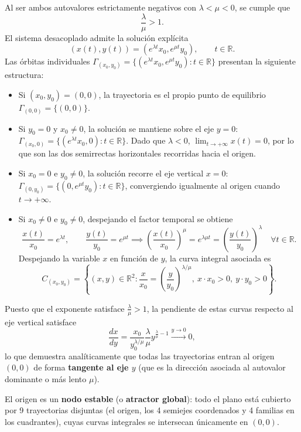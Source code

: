 Al ser ambos autovalores estrictamente negativos con $\lambda < \mu < 0$, se cumple que
\[
    \frac{\lambda}{\mu} > 1.
\]
El sistema desacoplado admite la solución explícita
\[
    (x(t), y(t)) = (e^{\lambda t} x_0, e^{\mu t} y_0), \qquad t \in \mathbb{R}.
\]
Las órbitas individuales $\Gamma_{(x_0, y_0)} = \{ (e^{\lambda t} x_0, e^{\mu t} y_0) : t \in \mathbb{R} \}$ presentan la siguiente estructura:
\begin{itemize}
    \item Si $(x_0, y_0) = (0,0)$, la trayectoria es el propio punto de equilibrio $\Gamma_{(0,0)} = \{ (0,0) \}$.
    \item Si $y_0 = 0$ y $x_0 \neq 0$, la solución se mantiene sobre el eje $y = 0$: $\Gamma_{(x_0, 0)} = \{ (e^{\lambda t} x_0, 0) : t \in \mathbb{R} \}$. Dado que $\lambda < 0$, $\lim_{t \to +\infty} x(t) = 0$, por lo que son las dos semirrectas horizontales recorridas hacia el origen.
    \item Si $x_0 = 0$ e $y_0 \neq 0$, la solución recorre el eje vertical $x = 0$: $\Gamma_{(0, y_0)} = \{ (0, e^{\mu t} y_0) : t \in \mathbb{R} \}$, convergiendo igualmente al origen cuando $t \to +\infty$.
    \item Si $x_0 \neq 0$ e $y_0 \neq 0$, despejando el factor temporal se obtiene
    \[
        \frac{x(t)}{x_0} = e^{\lambda t}, \qquad \frac{y(t)}{y_0} = e^{\mu t}
        \implies
        \left( \frac{x(t)}{x_0} \right)^\mu = e^{\lambda \mu t} = \left( \frac{y(t)}{y_0} \right)^\lambda \quad \forall t \in \mathbb{R}.
    \]
    Despejando la variable $x$ en función de $y$, la curva integral asociada es
    \[
        C_{(x_0, y_0)} = \left\{ (x, y) \in \mathbb{R}^2 : \frac{x}{x_0} = \left( \frac{y}{y_0} \right)^{\lambda/\mu}, \ x \cdot x_0 > 0, \ y \cdot y_0 > 0 \right\}.
    \]
\end{itemize}
Puesto que el exponente satisface $\frac{\lambda}{\mu} > 1$, la pendiente de estas curvas respecto al eje vertical satisface
\[
    \frac{dx}{dy} = \frac{x_0}{y_0^{\lambda/\mu}} \frac{\lambda}{\mu} y^{\frac{\lambda}{\mu} - 1} \xrightarrow{y \to 0} 0,
\]
lo que demuestra analíticamente que todas las trayectorias entran al origen $(0,0)$ de forma \textbf{tangente al eje $y$} (que es la dirección asociada al autovalor dominante o más lento $\mu$).

El origen es un \textbf{nodo estable} (o \textbf{atractor global}): todo el plano está cubierto por 9 trayectorias disjuntas (el origen, los 4 semiejes coordenados y 4 familias en los cuadrantes), cuyas curvas integrales se intersecan únicamente en $(0,0)$.

